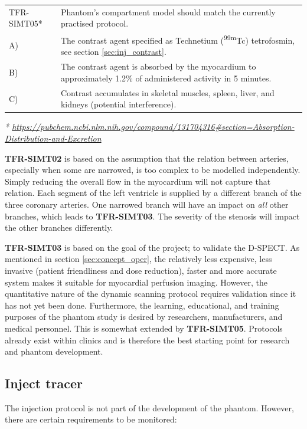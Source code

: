 \begin{table} [H]
\begin{tabular}{l|p{120mm}|}
	TFR-SIMT05* & Phantom's compartment model should match the currently practised protocol.\\
	\hspace{1.5cm} A) & The contrast agent specified as Technetium (\textsuperscript{99m}Tc) tetrofosmin, see section \ref{sec:inj_contrast}. \\
	\hspace{1.5cm} B) & The contrast agent is absorbed by the myocardium to approximately 1.2\% of administered activity in 5 minutes. \\
	\hspace{1.5cm} C) & Contrast accumulates in skeletal muscles, spleen, liver, and kidneys (potential interference). \\
	\cline{2-2}
\end{tabular}
\raggedright
\textit{* \url{https://pubchem.ncbi.nlm.nih.gov/compound/131704316\#section=Absorption-Distribution-and-Excretion}}
\end{table}

\textbf{TFR-SIMT02} is based on the assumption that the relation between arteries, especially when some are narrowed, is too complex to be modelled independently. Simply reducing the overall flow in the myocardium will not capture that relation. Each segment of the left ventricle is supplied by a different branch of the three coronary arteries. One narrowed branch will have an impact on \textit{all} other branches, which leads to \textbf{TFR-SIMT03}. The severity of the stenosis will impact the other branches differently.

\textbf{TFR-SIMT03} is based on the goal of the project; to validate the D-SPECT. As mentioned in section \ref{sec:concept_oper}, the relatively less expensive, less invasive (patient friendliness and dose reduction), faster and more accurate system makes it suitable for myocardial perfusion imaging. However, the quantitative nature of the dynamic scanning protocol requires validation since it has not yet been done. Furthermore, the learning, educational, and training purposes of the phantom study is desired by researchers, manufacturers, and medical personnel. This is somewhat extended by \textbf{TFR-SIMT05}. Protocols already exist within clinics and is therefore the best starting point for research and phantom development.

\subsection{Inject tracer}
\label{sec:inj_tracer}
The injection protocol is not part of the development of the phantom. However, there are certain requirements to be monitored:

